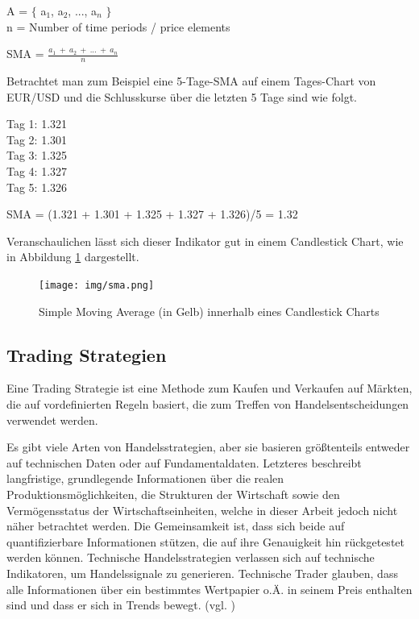 \documentclass[oneside]{ausarbeitung}
\begin{document}
A = $ \{ $ {a$_{1}$, a$_{2}$, ..., a$_{n}$} $ \} $ \\
n = Number of time periods / price elements

SMA = $\frac{a_1 \ + \ a_2 \ + \ ... \ + \ a_n}{n}$

Betrachtet man zum Beispiel eine 5-Tage-SMA auf einem Tages-Chart von
EUR/USD und die Schlusskurse über die letzten 5 Tage sind wie folgt.

Tag 1: 1.321 \\
Tag 2: 1.301 \\
Tag 3: 1.325 \\
Tag 4: 1.327 \\
Tag 5: 1.326

SMA = (1.321 + 1.301 + 1.325 + 1.327 + 1.326)/5 = 1.32

Veranschaulichen lässt sich dieser Indikator gut in einem Candlestick
Chart, wie in Abbildung \ref{fig:3} dargestellt.

\begin{figure}[H]
  \centering
  \texttt{[image: img/sma.png]}
  \caption{Simple Moving Average (in Gelb) innerhalb eines Candlestick Charts}
  \label{fig:3}
\end{figure} 

\subsection{Trading Strategien}
\label{sub:trading_strategien}

Eine Trading Strategie ist eine Methode zum Kaufen und Verkaufen auf
Märkten, die auf vordefinierten Regeln basiert, die zum Treffen von
Handelsentscheidungen verwendet werden\cite{trading_strategy}.

Es gibt viele Arten von Handelsstrategien, aber sie basieren
größtenteils entweder auf technischen Daten oder auf
Fundamentaldaten. Letzteres beschreibt langfristige, grundlegende
Informationen über die realen Produktionsmöglichkeiten, die
Strukturen der Wirtschaft sowie den Vermögensstatus der
Wirtschaftseinheiten, welche in dieser Arbeit jedoch nicht näher
betrachtet werden\cite{fundamentaldaten}. Die Gemeinsamkeit ist, dass
sich beide auf quantifizierbare Informationen stützen, die auf ihre
Genauigkeit hin rückgetestet werden können.
Technische Handelsstrategien verlassen sich auf technische
Indikatoren, um Handelssignale zu generieren. Technische Trader
glauben, dass alle Informationen über ein bestimmtes Wertpapier o.Ä.
in seinem Preis enthalten sind und dass er sich in Trends bewegt.
(vgl. \cite{trading_strategy}) 
\end{document}

